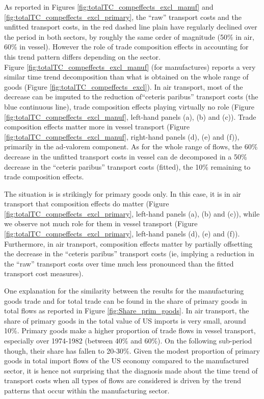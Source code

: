 \documentclass[11pt,twoside, authoryear]{elsarticle}
\begin{document}
As reported in Figures \ref{fig:totalTC_compeffects_excl_manuf} and \ref{fig:totalTC_compeffects_excl_primary}, the ``raw'' transport costs and the unfitted transport costs, in the red dashed line plain have regularly declined over the period in both sectors, by roughly the same order of magnitude (50\% in air, 60\% in vessel). However the role of trade composition effects in accounting for this trend pattern differs depending on the sector.\\
Figure \ref{fig:totalTC_compeffects_excl_manuf} (for manufactures) reports a very similar time trend decomposition than what is obtained on the whole range of goods (Figure \ref{fig:totalTC_compeffects_excl}).  In air transport, most of the decrease can be imputed to the reduction of``ceteris paribus'' transport costs (the blue continuous line), trade composition effects playing virtually no role (Figure \ref{fig:totalTC_compeffects_excl_manuf}, left-hand panels (a), (b) and (c)). Trade composition effects matter more in vessel transport (Figure \ref{fig:totalTC_compeffects_excl_manuf}, right-hand panels (d), (e) and (f)), primarily in the ad-valorem component. As for the whole range of flows, the 60\% decrease in the unfitted transport costs in vessel can de decomposed in a 50\% decrease in the ``ceteris paribus'' transport costs (fitted), the 10\% remaining to trade composition effects.

The situation is is strikingly for primary goods only. In this case, it is in air transport that composition effects do matter (Figure \ref{fig:totalTC_compeffects_excl_primary}, left-hand panels (a), (b) and (c)), while we observe not much role for them in vessel transport (Figure \ref{fig:totalTC_compeffects_excl_primary}, left-hand panels (d), (e) and (f)). Furthermore, in air transport, composition effects matter by partially offsetting the decrease in the ``ceteris paribus'' transport costs (ie, implying a reduction in the ``raw'' transport costs over time much less pronounced than the fitted transport cost measures).

One explanation for the similarity between the results for the manufacturing goods trade and for total trade can be found in the share of primary goods in total flows as reported in Figure \ref{fig:Share_prim_goods}. In air transport, the share of primary goods in the total value of US imports is very small, around 10\%. Primary goods make a higher proportion of trade flows in vessel transport, especially over 1974-1982 (between 40\% and 60\%). On the following sub-period though, their share has fallen to 20-30\%. Given the modest proportion of primary goods in total import flows of the US economy compared to the manufactured sector, it is hence not surprising that the diagnosis made about the time trend of transport costs when all types of flows are considered is driven by the trend patterns that occur within the manufacturing sector. 
\end{document}
